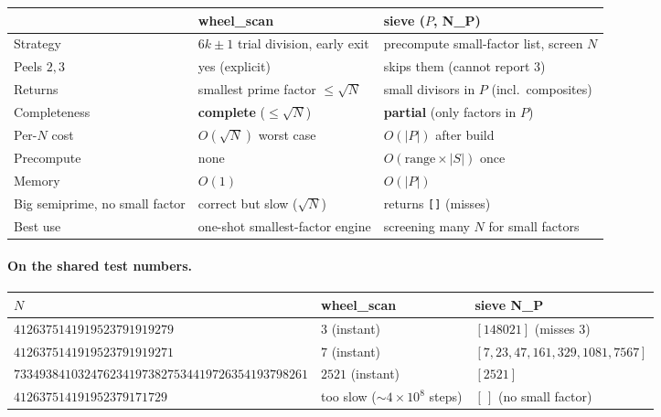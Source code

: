 \documentclass[11pt]{article}
\begin{document}
\begin{center}
\renewcommand{\arraystretch}{1.25}
\begin{tabular}{p{4.4cm} p{5.0cm} p{5.0cm}}
\toprule
& \textbf{wheel\_scan} & \textbf{sieve ($P$, N\_P)}\\
\midrule
Strategy & $6k\pm1$ trial division, early exit & precompute small-factor list, screen $N$\\
Peels $2,3$ & yes (explicit) & skips them (cannot report $3$)\\
Returns & smallest prime factor $\le\sqrt N$ & small divisors in $P$ (incl.\ composites)\\
Completeness & \textbf{complete} ($\le\sqrt N$) & \textbf{partial} (only factors in $P$)\\
Per-$N$ cost & $O(\sqrt N)$ worst case & $O(|P|)$ after build\\
Precompute & none & $O(\text{range}\times|S|)$ once\\
Memory & $O(1)$ & $O(|P|)$\\
Big semiprime, no small factor & correct but slow ($\sqrt N$) & returns \texttt{[]} (misses)\\
Best use & one-shot smallest-factor engine & screening many $N$ for small factors\\
\bottomrule
\end{tabular}
\end{center}

\paragraph{On the shared test numbers.}
\begin{center}
\renewcommand{\arraystretch}{1.25}
\begin{tabular}{p{6.6cm} p{3.2cm} p{4.4cm}}
\toprule
$N$ & \textbf{wheel\_scan} & \textbf{sieve N\_P}\\
\midrule
$4126375141919523791919279$ & $3$ (instant) & $[148021]$ (misses $3$)\\
$4126375141919523791919271$ & $7$ (instant) & $[7,23,47,161,329,1081,7567]$\\
$7334938410324762341973827534$\newline$419726354193798261$ & $2521$ (instant) & $[2521]$\\
$412637514191952379171729$ & too slow ($\sim\!4{\times}10^{8}$ steps) & $[\,]$ (no small factor)\\
\bottomrule
\end{tabular}
\end{center}
\end{document}
